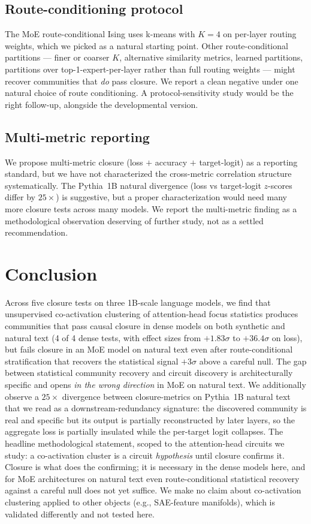 \documentclass[11pt]{article}
\begin{document}
\subsection{Route-conditioning protocol}
The MoE route-conditional Ising uses k-means with $K=4$ on per-layer
routing weights, which we picked as a natural starting point. Other
route-conditional partitions --- finer or coarser $K$, alternative
similarity metrics, learned partitions, partitions over
top-1-expert-per-layer rather than full routing weights --- might recover
communities that \emph{do} pass closure. We report a clean negative under
one natural choice of route conditioning. A protocol-sensitivity study
would be the right follow-up, alongside the developmental version.

\subsection{Multi-metric reporting}
We propose multi-metric closure (loss $+$ accuracy $+$ target-logit) as a
reporting standard, but we have not characterized the cross-metric
correlation structure systematically. The Pythia~1B natural divergence
(loss vs target-logit $z$-scores differ by $25\times$) is suggestive, but
a proper characterization would need many more closure tests across many
models. We report the multi-metric finding as a methodological observation
deserving of further study, not as a settled recommendation.

\section{Conclusion}

Across five closure tests on three 1B-scale language models, we find that
unsupervised co-activation clustering of attention-head focus statistics
produces communities that pass causal closure in dense models on both
synthetic and natural text (4 of 4 dense tests, with effect sizes from
$+1.83\sigma$ to $+36.4\sigma$ on loss), but fails closure in an MoE
model on natural text even after route-conditional stratification that
recovers the statistical signal $+3\sigma$ above a careful null. The gap
between statistical community recovery and circuit discovery is
architecturally specific and opens \emph{in the wrong direction} in MoE
on natural text. We additionally observe a $25\times$ divergence between
closure-metrics on Pythia~1B natural text that we read as a
downstream-redundancy signature: the discovered community is real and
specific but its output is partially reconstructed by later layers, so
the aggregate loss is partially insulated while the per-target logit
collapses. The headline methodological statement, scoped to the
attention-head circuits we study: a co-activation cluster is a circuit
\emph{hypothesis} until closure confirms it. Closure is what does the
confirming; it is necessary in the dense models here, and for MoE
architectures on natural text even route-conditional statistical
recovery against a careful null does not yet suffice. We make no claim
about co-activation clustering applied to other objects (e.g.,
SAE-feature manifolds), which is validated differently and not tested
here.
\end{document}
